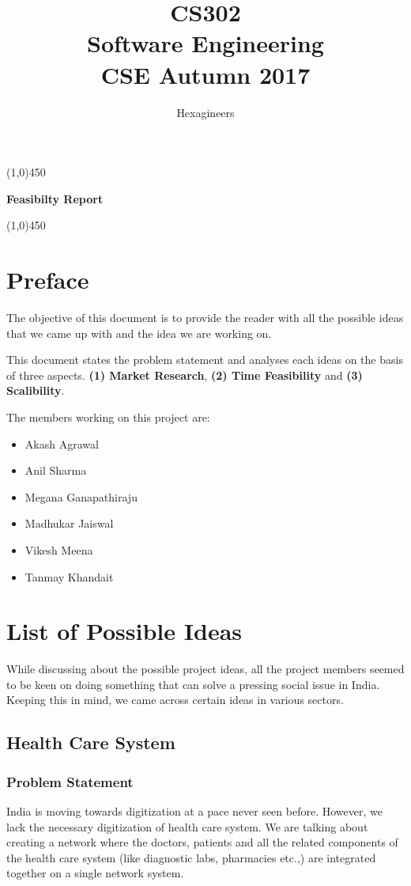 \documentclass{article}
\title{\textbf{CS302}\\\HUGE Software Engineering\\
\LARGE CSE\hspace{\labelsep}\textbullet\hspace{\labelsep} Autumn 2017
}
\author{Hexagineers}
\begin{document}
\maketitle
\line(1,0){450}

\begin{center}
\textbf{\Huge Feasibilty Report}
\end{center}
\line(1,0){450}
\newpage

\tableofcontents
\newpage

\section{Preface}
\par The objective of this document is to provide the reader with all the possible ideas that we came up with and the idea we are working on.

\par This document states the problem statement and analyses each ideas on the basis of three aspects. \textbf{(1) Market Research}, \textbf{(2) Time Feasibility} and \textbf{(3) Scalibility}. 
\par The members working on this project are:
\begin{itemize}
    \item Akash Agrawal
    \item Anil Sharma
    \item Megana Ganapathiraju
    \item Madhukar Jaiswal
    \item Vikesh Meena
    \item Tanmay Khandait
\end{itemize}
\newpage
\section{List of Possible Ideas}
\par While discussing about the possible project ideas, all the project members seemed to be keen on doing something that can solve a pressing social issue in India. Keeping this in mind, we came across certain ideas in various sectors.
\subsection{Health Care System}
\subsubsection{Problem Statement}
\par India is moving towards digitization at a pace never seen before. However, we lack the necessary digitization of health care system. 
We are talking about creating a network where the doctors, patients and all the related components of the health care system (like diagnostic labs, pharmacies etc.,) are integrated together on a single network system.
\end{document}
